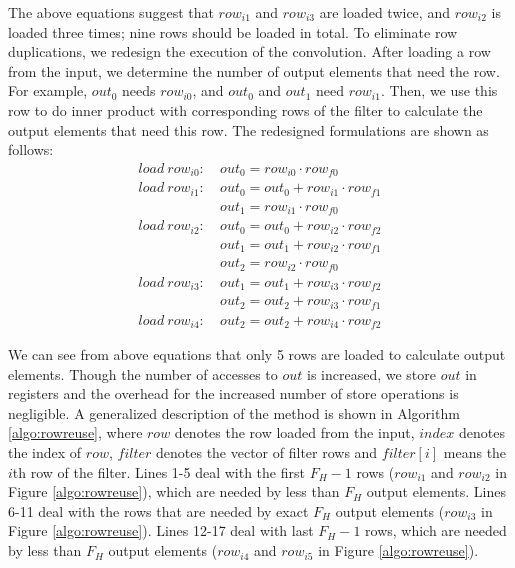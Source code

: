 The above equations suggest that $row_{i1}$ and $row_{i3}$ are loaded twice, and $row_{i2}$ is loaded three times; nine rows should be loaded in total. To eliminate row duplications, we redesign the execution of the convolution. After loading a row from the input, we determine the number of output elements that need the row. For example, $out_0$ needs $row_{i0}$, and $out_0$ and $out_1$ need $row_{i1}$. Then, we use
this row to do inner product with corresponding rows of the filter to calculate the output elements that need this row. The redesigned formulations are shown as follows:
\begin{equation}\nonumber
\begin{aligned}
load\ row_{i0}:
&\ out_0=row_{i0} \cdot row_{f0} \\
load\ row_{i1}:
&\ out_0 = out_0+row_{i1} \cdot row_{f1}\\
&\ out_1=row_{i1} \cdot row_{f0}\\
load\ row_{i2}:
&\ out_0 = out_0+row_{i2} \cdot row_{f2}\\
&\ out_1 = out_1+row_{i2} \cdot row_{f1}\\
&\ out_{2}=row_{i2} \cdot row_{f0}\\
load\ row_{i3}:
&\ out_1=out_1+row_{i3} \cdot row_{f2} \\
&\ out_2=out_2+row_{i3} \cdot row_{f1}\\
load\ row_{i4}:
&\ out_2=out_2+row_{i4} \cdot row_{f2}
\end{aligned}	
\end{equation}



We can see from above equations that only 5 rows are loaded to calculate output elements. {\color{red}Though the number of accesses to $out$ is increased, we store $out$ in registers and the overhead for the increased number of store operations is negligible.} A generalized description of the method is
shown in Algorithm \ref{algo:rowreuse}, where $row$ denotes the row loaded from the input, $index$ denotes the index of $row$, $filter$ denotes
the vector of filter rows and $filter[i]$ means the $i$th row of the filter. Lines 1-5 deal with the first $F_H-1$ rows ($row_{i1}$ and $row_{i2}$ in Figure \ref{algo:rowreuse}), which
are needed by less than $F_H$ output elements. Lines 6-11 deal with the rows that are needed by exact $F_H$ output elements ($row_{i3}$ in
Figure \ref{algo:rowreuse}). Lines 12-17 deal with last $F_H-1$ rows, which are needed by less than $F_H$ output elements ($row_{i4}$
and $row_{i5}$ in Figure \ref{algo:rowreuse}).

